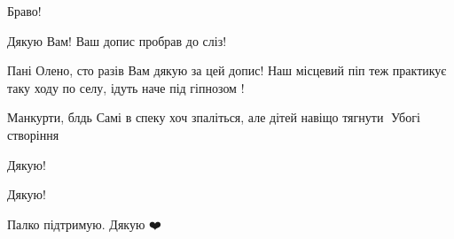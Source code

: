 \begin{itemize}
Браво!

 
Дякую Вам! Ваш допис пробрав до сліз!

 
Пані Олено, сто разів Вам дякую за цей допис! Наш місцевий піп теж практикує таку ходу по селу, ідуть наче під гіпнозом !

 
Манкурти, блдь
Самі в спеку хоч зпаліться, але дітей навіщо тягнути🤔
Убогі створіння

 
Дякую!

 
Дякую!

 
Палко підтримую. Дякую ❤️

 


\end{itemize}

